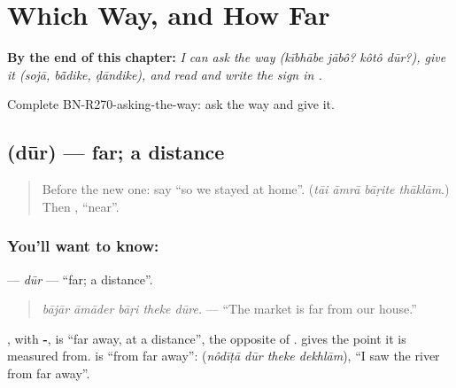 
\chapter{Which Way, and How Far}
\label{ch:bn-which-way-and-how-far}

\begin{chapteropening}
\textbf{By the end of this chapter:} \emph{I can ask the way (kībhābe jābô? kôtô dūr?), give it (sojā, bā̃dike, ḍāndike), and read and write the sign  in .}

Complete BN-R270-asking-the-way: ask the way and give it.
\end{chapteropening}

\section[\texorpdfstring{\bn{দূর} (dūr)}{দূর (dūr)}]{ (dūr) — far; a distance}

\label{lesson:BN-C270-dur}



\begin{quote}
Before the new one: say \textquotedblleft{}so we stayed at home\textquotedblright{}. (\emph{tāi āmrā bāṛite thāklām}.) Then \textbf{}, \textquotedblleft{}near\textquotedblright{}.
\end{quote}

\subsection*{You'll want to know: }
\textbf{} — \emph{dūr} — \textquotedblleft{}far; a distance\textquotedblright{}.

\begin{quote}
\textbf{    }
\end{quote}

\begin{quote}
\emph{bājār āmāder bāṛi theke dūre.} — \textquotedblleft{}The market is far from our house.\textquotedblright{}
\end{quote}

\textbf{}, with \textbf{-}, is \textquotedblleft{}far away, at a distance\textquotedblright{}, the opposite of \textbf{}. \textbf{} gives the point it is measured from. \textbf{ } is \textquotedblleft{}from far away\textquotedblright{}: \textbf{   } (\emph{nôdīṭā dūr theke dekhlām}), \textquotedblleft{}I saw the river from far away\textquotedblright{}.

